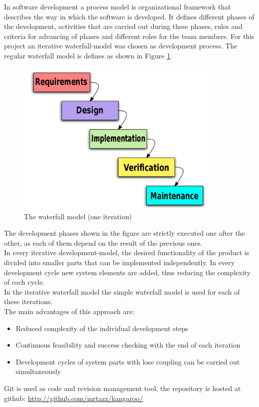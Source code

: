 In software development a process model is organizational framework that describes the way in which the software is developed. It defines different phases of the development, activities that are carried out during these phases, rules and criteria for advancing of phases and different roles for the team members. For this project an iterative waterfall-model was chosen as development process. 
The regular waterfall model is defines as shown in Figure \ref{waterfall}. 
\begin{figure}[h!]
\centering
\includegraphics[width=10cm]{pics/waterfall.png}
\caption{The waterfall model (one iteration)}
\label{waterfall}
\end{figure}
The development phases shown in the figure are strictly executed one after the other, as each of them depend on the result of the previous ones. \\ In every iterative development-model, the desired functionality of the product is divided into smaller parts that can be implemented independently. In every development cycle new system elements are added, thus reducing the  complexity of each cycle.\\ In the iterative waterfall model the simple waterfall model is used for each of these iterations. \\ The main advantages of this approach are:
\begin{itemize}
\item Reduced complexity of the individual development steps
\item Continuous feasibility and success checking with the end of each iteration
\item Development cycles of system parts with lose coupling can be carried out simultaneously
\end{itemize}
Git is used as code and revision management tool, the repository is hosted at github: \url{http://github.com/mrtazz/kangaroo/}



